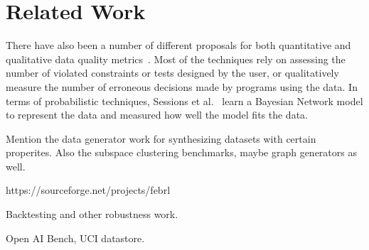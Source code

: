 \section{Related Work}
There have also been a number of different proposals for both quantitative and qualitative data quality metrics~\cite{DBLP:journals/cacm/PipinoLW02, DBLP:journals/jdiq/CheahP15, DBLP:journals/jdiq/EvenS09,DBLP:journals/jdiq/SessionsV09, DBLP:journals/tkde/FanGLX11,DBLP:journals/sigmetrics/KeetonMW09}.
Most of the techniques rely on assessing the number of violated constraints or tests designed by the user, or qualitatively measure the number of erroneous decisions made by programs using the data.
In terms of probabilistic techniques, Sessions et al.~\cite{DBLP:journals/jdiq/SessionsV09} learn a Bayesian Network model to represent the data and measured how well the model fits the data.


Mention the data generator work  for synthesizing datasets with certain properites.   Also the subspace clustering benchmarks, maybe graph generators as well.

https://sourceforge.net/projects/febrl

Backtesting and other robustness work.

Open AI Bench, UCI datastore.


